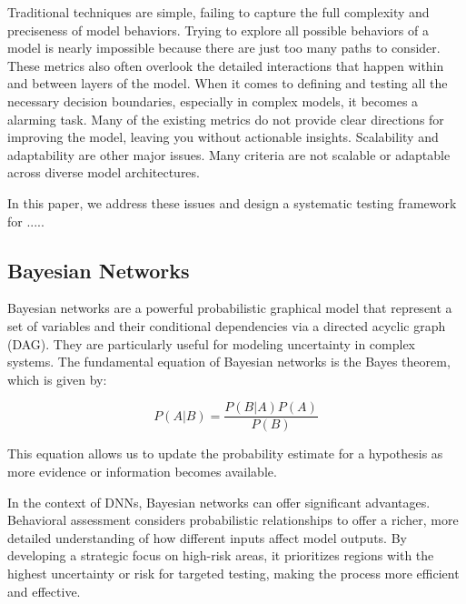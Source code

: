 \documentclass[10pt, conference, a4paper, final]{IEEEtran}
\begin{document}
Traditional techniques are simple, failing to capture the full complexity and preciseness of model behaviors. Trying to explore all possible behaviors of a model is nearly impossible because there are just too many paths to consider. These metrics also often overlook the detailed interactions that happen within and between layers of the model. When it comes to defining and testing all the necessary decision boundaries, especially in complex models, it becomes a alarming task.  Many of the existing metrics do not provide clear directions for improving the model, leaving you without actionable insights. Scalability and adaptability are other major issues. Many criteria are not scalable or adaptable across diverse model architectures.

In this paper, we address these issues and design a systematic testing framework for .....

\subsection{Bayesian Networks}


Bayesian networks are a powerful probabilistic graphical model that represent a set of variables and their conditional dependencies via a directed acyclic graph (DAG). They are particularly useful for modeling uncertainty in complex systems. The fundamental equation of Bayesian networks is the Bayes theorem, which is given by:

\begin{equation}
P(A|B) = \frac{P(B|A)P(A)}{P(B)}
\end{equation}

This equation allows us to update the probability estimate for a hypothesis as more evidence or information becomes available.

In the context of DNNs, Bayesian networks can offer significant advantages. Behavioral assessment considers probabilistic relationships to offer a richer, more detailed understanding of how different inputs affect model outputs. By developing a strategic focus on high-risk areas, it prioritizes regions with the highest uncertainty or risk for targeted testing, making the process more efficient and effective. 
\end{document}
